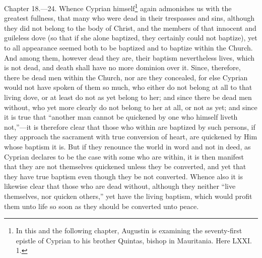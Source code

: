 Chapter 18.—24. Whence Cyprian himself\footnote{\par  In this and the following chapter, Augustin is examining the seventy-first epistle of Cyprian to his brother Quintas, bishop in Mauritania. Here LXXI. 1.} again admonishes us with the greatest fullness, that many who were dead in their trespasses and sins, although they did not belong to the body of Christ, and the members of that innocent and guileless dove (so that if she alone baptized, they certainly could not baptize), yet to all appearance seemed both to be baptized and to baptize within the Church. And among them, however dead they are, their baptism nevertheless lives, which is not dead, and death shall have no more dominion over it. Since, therefore, there be dead men within the Church, nor are they concealed, for else Cyprian would not have spoken of them so much, who either do not belong at all to that living dove, or at least do not as yet belong to her; and since there be dead men without, who yet more clearly do not belong to her at all, or not as yet; and since it is true that ``another man cannot be quickened by one who himself liveth not,''—it is therefore clear that those who within are baptized by such persons, if they approach the sacrament with true conversion of heart, are quickened by Him whose baptism it is. But if they renounce the world in word and not in deed, as Cyprian declares to be the case with some who are within, it is then manifest that they are not themselves quickened unless they be converted, and yet that they have true baptism even though they be not converted. Whence also it is likewise clear that those who are dead without, although they neither ``live themselves, nor quicken others,'' yet have the living baptism, which would profit them unto life so soon as they should be converted unto peace.


